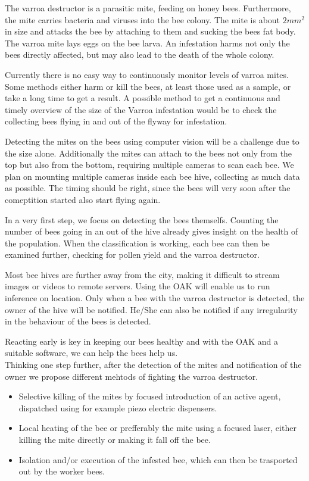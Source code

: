 \documentclass[a4paper,titlepage]{article}
\begin{document}
The varroa destructor is a parasitic mite, feeding on honey bees.
Furthermore, the mite carries bacteria and viruses into the bee colony.
The mite is about $ 2 mm^2 $ in size and attacks the bee by attaching to them and sucking the bees fat body.
The varroa mite lays eggs on the bee larva.
An infestation harms not only the bees directly affected, but may also lead to the death of the whole colony.

Currently there is no easy way to continuously monitor levels of varroa mites.
Some methods either harm or kill the bees, at least those used as a sample, or take a long time to get a result.
A possible method to get a continuous and timely overview of the size of the Varroa infestation would be to check the collecting bees flying in and out of the flyway for infestation.

Detecting the mites on the bees using computer vision will be a challenge due to the size alone.
Additionally the mites can attach to the bees not only from the top but also from the bottom, requiring multiple cameras to scan each bee.
We plan on mounting multiple cameras inside each bee hive, collecting as much data as possible.
The timing should be right, since the bees will very soon after the comeptition started also start flying again.

In a very first step, we focus on detecting the bees themselfs.
Counting the number of bees going in an out of the hive already gives insight on the health of the population.
When the classification is working, each bee can then be examined further, checking for pollen yield and the varroa destructor.

Most bee hives are further away from the city, making it difficult to stream images or videos to remote servers.
Using the OAK will enable us to run inference on location.
Only when a bee with the varroa destructor is detected, the owner of the hive will be notified.
He/She can also be notified if any irregularity in the behaviour of the bees is detected.

Reacting early is key in keeping our bees healthy and with the OAK and a suitable software, we can help the bees help us. \\

Thinking one step further, after the detection of the mites and notification of the owner we propose different mehtods of fighting the varroa destructor.

\begin{itemize}
    \item Selective killing of the mites by focused introduction of an active agent, dispatched using for example piezo electric dispensers.
    \item Local heating of the bee or prefferably the mite using a focused laser, either killing the mite directly or making it fall off the bee.
    \item Isolation and/or execution of the infested bee, which can then be trasported out by the worker bees.
\end{itemize}
\end{document}
